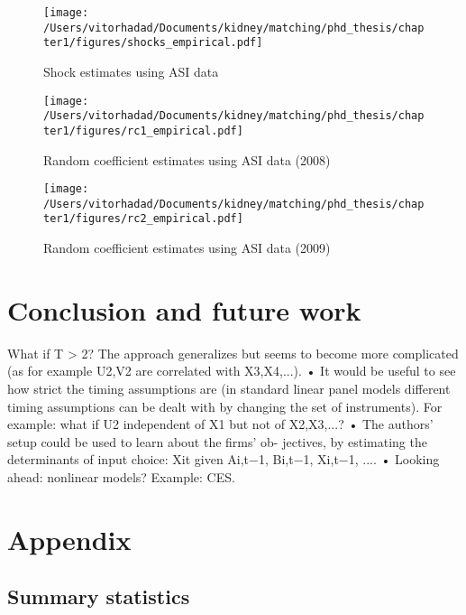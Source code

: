 \begin{figure}
  \centering
  \texttt{[image: /Users/vitorhadad/Documents/kidney/matching/phd\_thesis/chapter1/figures/shocks\_empirical.pdf]}
  \caption[Shock estimates using ASI data]{Shock estimates using ASI data}
\end{figure}


\begin{figure}
  \centering
  \texttt{[image: /Users/vitorhadad/Documents/kidney/matching/phd\_thesis/chapter1/figures/rc1\_empirical.pdf]}
  \caption[Random coefficient estimates using ASI data (2008)]{Random coefficient estimates using ASI data (2008)}
\end{figure}

\begin{figure}
  \centering
  \texttt{[image: /Users/vitorhadad/Documents/kidney/matching/phd\_thesis/chapter1/figures/rc2\_empirical.pdf]}
    \caption[Random coefficient estimates using ASI data (2009)]{Random coefficient estimates using ASI data (2009)}
\end{figure}





\clearpage


\section{Conclusion and future work}


What if T > 2? The approach generalizes but seems to become more complicated (as for example U2,V2 are correlated with X3,X4,...).
• It would be useful to see how strict the timing assumptions are (in standard linear panel models different timing assumptions can be dealt with by changing the set of instruments). For example: what if U2 independent of X1 but not of X2,X3,...?
• The authors’ setup could be used to learn about the firms’ ob- jectives, by estimating the determinants of input choice: Xit given
Ai,t−1, Bi,t−1, Xi,t−1, ....
• Looking ahead: nonlinear models? Example: CES.



\section{Appendix}

\subsection{Summary statistics} \label{sec:summary_statistics}



